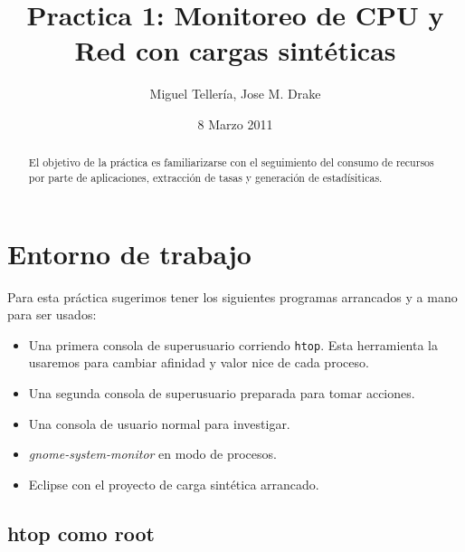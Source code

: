 \documentclass[a4paper,11pt,spanish,twoside]{article}
\begin{document}
\title{Practica 1:  Monitoreo de CPU y Red con cargas sintéticas}

\author{Miguel Tellería, Jose M. Drake}

\date{8 Marzo 2011}

\maketitle
\thispagestyle{empty} %

\begin{abstract}

El objetivo de la práctica es familiarizarse con el seguimiento del
consumo de recursos por parte de aplicaciones, extracción de tasas y
generación de estadísiticas.

\end{abstract}

\section{Entorno de trabajo}
\label{sec:workenvironment}

Para esta práctica sugerimos tener los siguientes programas arrancados
y a mano para ser usados:

\begin{itemize}
\item Una primera consola de superusuario corriendo \texttt{htop}.
  Esta herramienta la usaremos para cambiar afinidad y valor nice de
  cada proceso.

\item Una segunda consola de superusuario preparada para tomar
  acciones.

\item Una consola de usuario normal para investigar.

\item \emph{gnome-system-monitor} en modo de procesos.

\item Eclipse con el proyecto de carga sintética arrancado.

\end{itemize}

\subsection{htop como root}
\label{sec:htopoptions}
\end{document}
